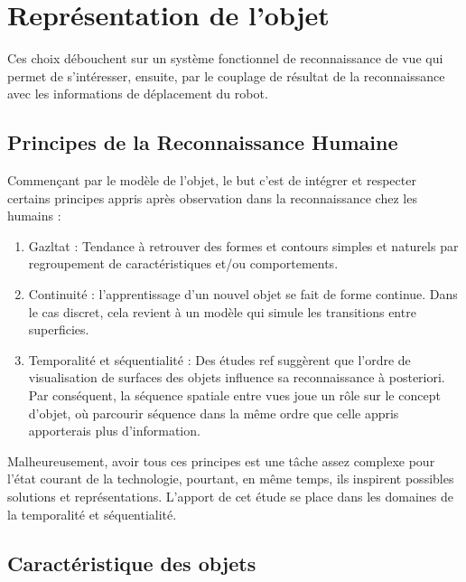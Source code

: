 \section{Représentation de l'objet}

Ces choix débouchent sur un système fonctionnel de reconnaissance de
vue qui permet de s’intéresser, ensuite, par le couplage de résultat de la
reconnaissance avec les informations de déplacement du robot.

{\color {green}
  \subsection {Principes de la Reconnaissance Humaine}

  Commençant par le modèle de l'objet, le but c'est de intégrer et
  respecter certains principes appris après observation dans la
  reconnaissance chez les humains :

  \begin{enumerate}
  \item Gazltat : Tendance à retrouver des formes et contours simples et
    naturels par regroupement de caractéristiques et/ou comportements.

  \item Continuité : l'apprentissage d'un nouvel objet se fait de forme
    continue. Dans le cas discret, cela revient à un modèle qui simule les
    transitions entre superficies.

  \item Temporalité et séquentialité : Des études {\color{blue} ref} suggèrent que l'ordre
    de visualisation de surfaces des objets influence sa reconnaissance à
    posteriori. Par conséquent, la séquence spatiale entre vues joue un rôle sur le concept d'objet, où parcourir
    séquence dans la même ordre que celle appris apporterais plus d'information.

  \end{enumerate}

  Malheureusement, avoir tous ces principes est une tâche assez complexe
  pour l’état courant de la technologie, pourtant, en même temps, ils inspirent
  possibles solutions et représentations. L'apport de cet étude se place dans les
  domaines de la temporalité et séquentialité.

  \subsection{Caractéristique des objets} 

}
